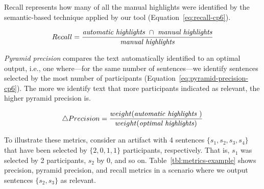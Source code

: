 Recall represents how many of all the manual highlights were identified by the semantic-based technique applied by our tool (Equation~\ref{eq:recall-cp6}). 



\medskip
\begin{small}
\begin{equation}
    Recall = \frac{
        \text{\textit{automatic highlights}~} \cap 
        \text{~\textit{manual highlights}}
    }{\text{\textit{manual highlights}}}
\label{eq:recall-cp6}    
\end{equation}
\end{small}

\medskip


\textit{Pyramid precision} compares the text automatically identified to an optimal output, i.e., one where---for the same number of sentences---we identify sentences selected by the most number of participants (Equation~\ref{eq:pyramid-precision-cp6}). The more we identify text that more participants indicated as relevant, the higher pyramid precision is.



\medskip
\begin{small}
\begin{equation}
    \triangle Precision = \frac{
        weight(\text{\textit{automatic highlights}~})
    }{weight(\text{\textit{optimal highlights}})}
\label{eq:pyramid-precision-cp6}    
\end{equation}
\end{small}
    


To illustrate these metrics, consider an artifact with 4 sentences $\{s_1, s_2, s_3, s_4\}$ that have been selected by $\{2, 0, 1, 1\}$ participants, respectively. That is, $s_1$ was selected by 2 participants, $s_2$ by 0, and so on.
Table~\ref{tbl:metrics-example} shows precision, pyramid precision, and recall metrics in a scenario where we output sentences $\{s_2, s_3\}$ as relevant.
    








